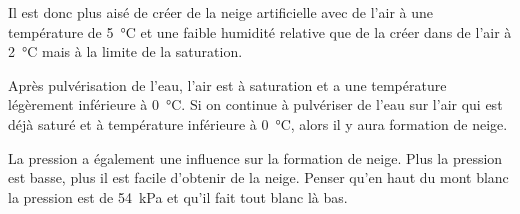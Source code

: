 Il est donc plus aisé de créer de la neige artificielle avec de l’air à une température de \SI{5}{\celsius} et une faible humidité relative que de la créer dans de l’air à \SI{2}{\celsius} mais à la limite de la saturation.

Après pulvérisation de l’eau, l’air est à saturation et a une température légèrement inférieure à \SI{0}{\celsius}. Si on continue à pulvériser de l’eau sur l’air qui est déjà saturé et à température inférieure à \SI{0}{\celsius}, alors il y aura formation de neige.

La pression a également une influence sur la formation de neige. Plus la pression est basse, plus il est facile d’obtenir de la neige. Penser qu’en haut du mont blanc la pression est de \SI{54}{\kilo\pascal} et qu’il fait tout blanc là bas.
